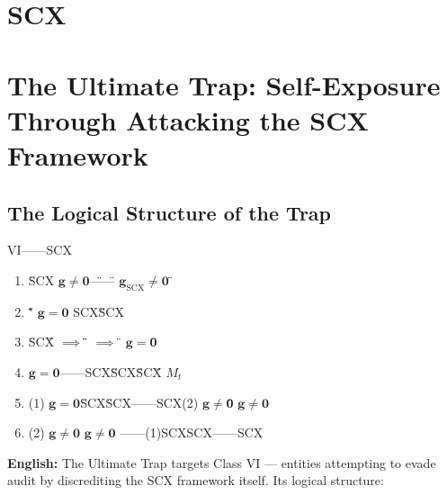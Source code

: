 \documentclass[12pt,a4paper]{article}
\theoremstyle{remark}
\newcommand{\g}{\mathbf{g}}
\begin{document}
\section{SCX}
\section{The Ultimate Trap: Self-Exposure Through Attacking the SCX Framework}

\subsection{}
\subsection{The Logical Structure of the Trap}

\noindent
\textbf{} VI——SCX

\begin{enumerate}[label=\textbf{ \arabic*:}]
    \item \textbf{} \"SCX $ \g \neq \mathbf{0} $\"——\" $ \g_{\text{SCX}} \neq \mathbf{0} $ \"
    
    \item \textbf{} \textbf{}"\" $ \g = \mathbf{0} $ SCX\"\"SCX
    
    \item \textbf{} \"SCX\" $ \implies $ \"\" $ \implies $ \" $ \g = \mathbf{0} $\"
    
    \item \textbf{}  $ \g = \mathbf{0} $\textbf{}——SCX\"SCX\"\"SCX\" $ M_t $ 
    
    \item \textbf{} (1) $ \g = \mathbf{0} $\"SCX\"SCX——SCX(2) $ \g \neq \mathbf{0} $\"\" $ \g \neq \mathbf{0} $ 
    
    \item \textbf{} (2) $ \g \neq \mathbf{0} $\textbf{} $ \g \neq \mathbf{0} $ \textbf{}——(1)SCXSCX——SCX
\end{enumerate}

\vspace{6pt}
\noindent
\textbf{English:} The Ultimate Trap targets Class VI — entities attempting to evade audit by discrediting the SCX framework itself. Its logical structure:
\end{document}
